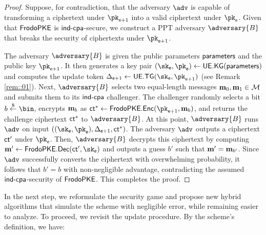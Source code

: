 \documentclass{fundam}
\begin{document}
\begin{proof}
Suppose, for contradiction, that the adversary $\adv$ is capable of transforming a ciphertext under $\pk_{\epoch+1}$ into a valid ciphertext under $\pk_{\epoch}$. Given that $\mathsf{FrodoPKE}$ is $\mathsf{ind}{\text{-}}\mathsf{cpa}$-secure, we construct a PPT adversary $\adversary{B}$ that breaks the security of ciphertexts under $\pk_{\epoch+1}$.  

The adversary $\adversary{B}$ is given the public parameters $\mathsf{parameters}$ and the public key $\pk_{\epoch+1}$. It then generates a key pair $(\sk_{\epoch}, \pk_{\epoch})\gets \uekg(\params)$ and computes the update token $\tok_{\epoch+1}\gets\uetg(\sk_{\epoch},\pk_{\epoch+1})$ (see Remark \ref{rem::01}).
Next, $\adversary{B}$ selects two equal-length messages $\mathbf{m}_{0}, \mathbf{m}_{1}\in\mathcal{M}$ and submits them to its $\mathsf{ind}{\text{-}}\mathsf{cpa}$ challenger.
The challenger randomly selects a bit $b \sample \bin$, encrypts $\mathbf{m}_b$ as $\ct^* \gets \tx{FrodoPKE.Enc}(\pk_{\epoch+1}, \m_b)$, and returns the challenge ciphertext $\mathsf{ct}^*$ to $\adversary{B}$. At this point, $\adversary{B}$ runs $\adv$ on input $((\sk_{\epoch},\pk_{\epoch}),\tok_{\epoch+1}, \ct^{*})$. 
%
The adversary $\adv$ outputs a ciphertext $\mathsf{ct}'$ under $\pk_{\epoch}$. Then, $\adversary{B}$ decrypts this ciphertext by computing $\m'\gets \tx{FrodoPKE.Dec}(\ct', \sk_{\epoch})$ and outputs a guess $b'$ such that $\mathbf{m}' = \mathbf{m}_{b'}$. Since $\adv$ successfully converts the ciphertext with overwhelming probability, it follows that $b' = b$ with non-negligible advantage, contradicting the assumed $\mathsf{ind}{\text{-}}\mathsf{cpa}$-security of $\mathsf{FrodoPKE}$. This completes the proof.
\end{proof}	

In the next step, we reformulate the security game and propose new hybrid algorithms that simulate the scheme with negligible error, while remaining easier to analyze. To proceed, we revisit the update procedure. By the scheme’s definition, we have:
\end{document}
